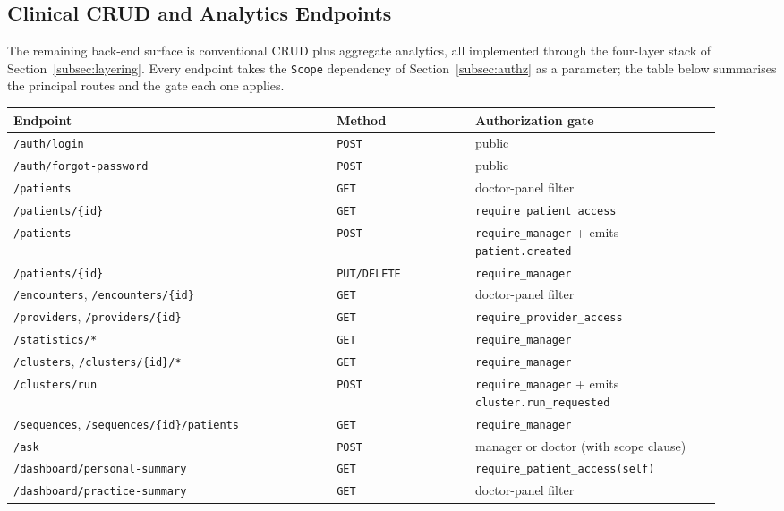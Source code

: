 \subsection{Clinical CRUD and Analytics Endpoints}
\label{subsec:endpoints}

The remaining back-end surface is conventional CRUD plus aggregate analytics, all implemented through the four-layer stack of Section~\ref{subsec:layering}. Every endpoint takes the \texttt{Scope} dependency of Section~\ref{subsec:authz} as a parameter; the table below summarises the principal routes and the gate each one applies.

\vspace{0.3em}
\begin{tabular}{@{}p{0.42\linewidth}p{0.18\linewidth}p{0.32\linewidth}@{}}
\textbf{Endpoint} & \textbf{Method} & \textbf{Authorization gate} \\
\hline
\texttt{/auth/login}                          & \texttt{POST}   & public \\
\texttt{/auth/forgot-password}                & \texttt{POST}   & public \\
\texttt{/patients}                            & \texttt{GET}    & doctor-panel filter \\
\texttt{/patients/\{id\}}                     & \texttt{GET}    & \texttt{require\_patient\_access} \\
\texttt{/patients}                            & \texttt{POST}   & \texttt{require\_manager} + emits \texttt{patient.created} \\
\texttt{/patients/\{id\}}                     & \texttt{PUT/DELETE} & \texttt{require\_manager} \\
\texttt{/encounters}, \texttt{/encounters/\{id\}} & \texttt{GET}    & doctor-panel filter \\
\texttt{/providers}, \texttt{/providers/\{id\}} & \texttt{GET}    & \texttt{require\_provider\_access} \\
\texttt{/statistics/*}                        & \texttt{GET}    & \texttt{require\_manager} \\
\texttt{/clusters}, \texttt{/clusters/\{id\}/*} & \texttt{GET}    & \texttt{require\_manager} \\
\texttt{/clusters/run}                        & \texttt{POST}   & \texttt{require\_manager} + emits \texttt{cluster.run\_requested} \\
\texttt{/sequences}, \texttt{/sequences/\{id\}/patients} & \texttt{GET} & \texttt{require\_manager} \\
\texttt{/ask}                                 & \texttt{POST}   & manager or doctor (with scope clause) \\
\texttt{/dashboard/personal-summary}          & \texttt{GET}    & \texttt{require\_patient\_access(self)} \\
\texttt{/dashboard/practice-summary}          & \texttt{GET}    & doctor-panel filter \\
\end{tabular}
\vspace{0.4em}

